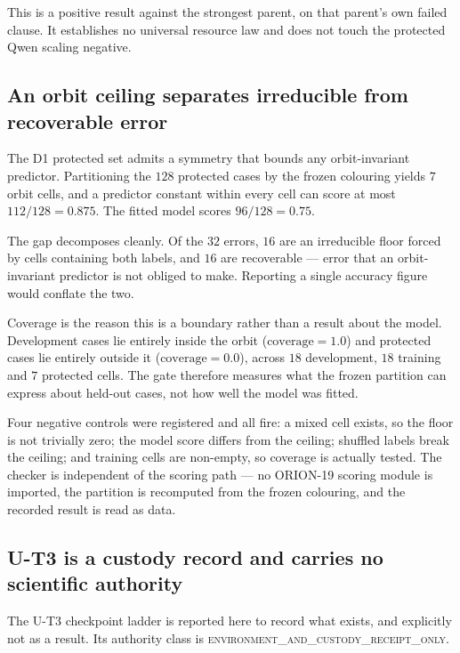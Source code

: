 This is a positive result against the strongest parent, on that parent's own failed
clause. It establishes no universal resource law and does not touch the protected
Qwen scaling negative.

\subsection{An orbit ceiling separates irreducible from recoverable error}
\label{sec:orbit-gate}

The D1 protected set admits a symmetry that bounds any orbit-invariant predictor.
Partitioning the $128$ protected cases by the frozen colouring yields $7$ orbit
cells, and a predictor constant within every cell can score at most $112/128 =
0.875$. The fitted model scores $96/128 = 0.75$.

The gap decomposes cleanly. Of the $32$ errors, $16$ are an irreducible floor forced
by cells containing both labels, and $16$ are recoverable --- error that an
orbit-invariant predictor is not obliged to make. Reporting a single accuracy figure
would conflate the two.

Coverage is the reason this is a boundary rather than a result about the model.
Development cases lie entirely inside the orbit ($\text{coverage} = 1.0$) and
protected cases lie entirely outside it ($\text{coverage} = 0.0$), across $18$
development, $18$ training and $7$ protected cells. The gate therefore measures
what the frozen partition can express about held-out cases, not how well the model
was fitted.

Four negative controls were registered and all fire: a mixed cell exists, so the
floor is not trivially zero; the model score differs from the ceiling; shuffled
labels break the ceiling; and training cells are non-empty, so coverage is actually
tested. The checker is independent of the scoring path --- no ORION-19 scoring
module is imported, the partition is recomputed from the frozen colouring, and the
recorded result is read as data.

\subsection{U-T3 is a custody record and carries no scientific authority}
\label{sec:ut3-custody}

The U-T3 checkpoint ladder is reported here to record what exists, and explicitly
not as a result. Its authority class is
\textsc{environment\_and\_custody\_receipt\_only}.

